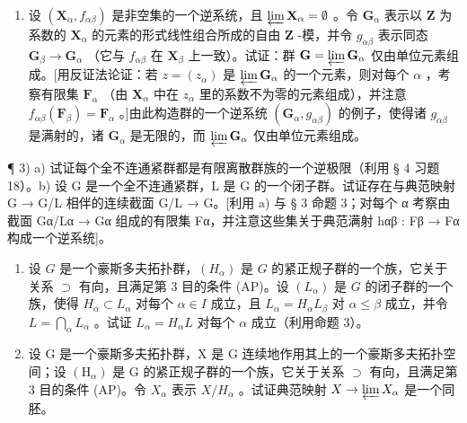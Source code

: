 \begin{enumerate}
\def\labelenumi{\arabic{enumi})}
\setcounter{enumi}{1}
\tightlist
\item
  设 \((\mathbf{X}_{\alpha}, f_{\alpha \beta})\) 是非空集的一个逆系统，且 \(\varprojlim \mathbf{X}_{\alpha} = \emptyset\) 。令 \(\mathbf{G}_{\alpha}\) 表示以 \(\mathbf{Z}\) 为系数的 \(\mathbf{X}_{\alpha}\) 的元素的形式线性组合所成的自由 \(\mathbf{Z}\) -模，并令 \(g_{\alpha \beta}\) 表示同态 \(\mathbf{G}_{\beta} \to \mathbf{G}_{\alpha}\) （它与 \(f_{\alpha \beta}\) 在 \(\mathbf{X}_{\beta}\) 上一致）。试证：群 \(\mathbf{G} = \varprojlim \mathbf{G}_{\alpha}\) 仅由单位元素组成。{[}用反证法论证：若 \(z = (z_{\alpha})\) 是 \(\varprojlim \mathbf{G}_{\alpha}\) 的一个元素，则对每个 \(\alpha\) ，考察有限集 \(\mathbf{F}_{\alpha}\) （由 \(\mathbf{X}_{\alpha}\) 中在 \(z_{\alpha}\) 里的系数不为零的元素组成），并注意 \(f_{\alpha \beta}(\mathbf{F}_{\beta}) = \mathbf{F}_{\alpha}\) 。{]}由此构造群的一个逆系统 \((\mathbf{G}_{\alpha}, g_{\alpha \beta})\) 的例子，使得诸 \(g_{\alpha \beta}\) 是满射的，诸 \(\mathbf{G}_{\alpha}\) 是无限的，而 \(\varprojlim \mathbf{G}_{\alpha}\) 仅由单位元素组成。
\end{enumerate}

¶ 3) a) 试证每个全不连通紧群都是有限离散群族的一个逆极限（利用 § 4 习题 18）。b) 设 G 是一个全不连通紧群，L 是 G 的一个闭子群。试证存在与典范映射 G → G/L 相伴的连续截面 G/L → G。{[}利用 a) 与 § 3 命题 3；对每个 α 考察由截面 Gα/Lα → Gα 组成的有限集 Fα，并注意这些集关于典范满射 hαβ : Fβ → Fα 构成一个逆系统{]}。

\begin{enumerate}
\def\labelenumi{\arabic{enumi})}
\setcounter{enumi}{3}
\item
  设 \(G\) 是一个豪斯多夫拓扑群，\((H_{\alpha})\) 是 \(G\) 的紧正规子群的一个族，它关于关系 \(\supset\) 有向，且满足第 3 目的条件 (AP)。设 \((L_{\alpha})\) 是 \(G\) 的闭子群的一个族，使得 \(H_{\alpha} \subset L_{\alpha}\) 对每个 \(\alpha \in I\) 成立，且 \(L_{\alpha} = H_{\alpha}L_{\beta}\) 对 \(\alpha \leqslant \beta\) 成立，并令 \(L = \bigcap_{\alpha} L_{\alpha}\) 。试证 \(L_{\alpha} = H_{\alpha}L\) 对每个 \(\alpha\) 成立（利用命题 3）。
\item
  设 G 是一个豪斯多夫拓扑群，X 是 G 连续地作用其上的一个豪斯多夫拓扑空间；设 \((\mathrm{H}_{\alpha})\) 是 G 的紧正规子群的一个族，它关于关系 \(\supset\) 有向，且满足第 3 目的条件 (AP)。令 \(X_{\alpha}\) 表示 \(X/H_{\alpha}\) 。试证典范映射 \(X \to \varprojlim X_{\alpha}\) 是一个同胚。
\end{enumerate}

